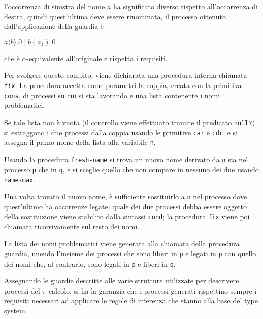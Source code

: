 l'occorrenza di sinistra del nome $a$ ha significato diverso rispetto
all'occorrenza di destra, quindi quest'ultima deve essere rinominata,
il processo ottenuto dall'applicazione della guardia \`e

\begin{pilisting}
$
    \overline{a}\langle b\rangle.0 \; | \;
    b(a_1).0
$
\end{pilisting}

che \`e $\alpha$-equivalente all'originale e rispetta i requisiti.

Per svolgere questo compito, viene dichiarata una procedura interna
chiamata \lstinline{fix}. La procedura accetta come parametri la coppia,
creata con la primitiva \lstinline{cons}, di processi su cui si sta
lavorando e una lista contenente i nomi problematici.

Se tale lista non \`e vuota (il controllo viene effettuato tramite il
predicato \lstinline{null?}) si estraggono i due processi dalla coppia
usando le primitive \lstinline{car} e \lstinline{cdr}, e si assegna il
primo nome della lista alla variabile \lstinline{n}.

Usando la procedura \lstinline{fresh-name} si trova un nuovo nome
derivato da \lstinline{n} sia nel processo \lstinline{p} che in
\lstinline{q}, e si sceglie quello che non compare in nessuno dei due
usando \lstinline{name-max}.

Una volta trovato il nuovo nome, \`e sufficiente sostituirlo a
\lstinline{n} nel processo dove quest'ultimo ha occorrenze legate: quale
dei due processi debba essere oggetto della sostituzione viene stabilito
dalla sintassi \lstinline{cond}; la procedura \lstinline{fix} viene poi
chiamata ricorsivamente sul resto dei nomi.

La lista dei nomi problematici viene generata alla chiamata della
procedura guardia, unendo l'insieme dei processi che sono liberi in
\lstinline{p} e legati in \lstinline{p} con quello dei nomi che, al
contrario, sono legati in \lstinline{p} e liberi in \lstinline{q}.

Assegnando le guardie descritte alle varie strutture utilizzate per
descrivere processi del $\pi$-calcolo, si ha la garanzia che i processi
generati rispettino sempre i requisiti necessari ad applicare le
regole di inferenza che stanno alla base del type system.
